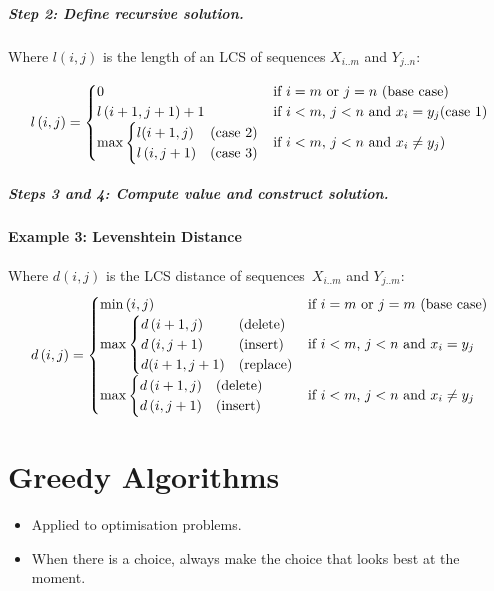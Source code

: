 \documentclass[twocolumn,english]{article}
\begin{document}
\subparagraph{Step 2: Define recursive solution.}

Where $l\left(i,j\right)$ is the length of an LCS of sequences $X_{i..m}$
and $Y_{j..n}$:

\[
l\left(i,j\right)=\begin{cases}
0 & \text{if \ensuremath{i=m} or \ensuremath{j=n} (base case)}\\
l\left(i+1,j+1\right)+1 & \text{if \ensuremath{i<m}, \ensuremath{j<n} and \ensuremath{x_{i}=y_{j}}(case 1)}\\
\max\begin{cases}
l(i+1,j) & \text{(case 2)}\\
l\left(i,j+1\right) & \text{(case 3)}
\end{cases} & \text{if \ensuremath{i<m}, \ensuremath{j<n} and \ensuremath{x_{i}\neq y_{j}})}
\end{cases}
\]

\subparagraph{Steps 3 and 4: Compute value and construct solution.}

\paragraph{Example 3: Levenshtein Distance}

Where $d\left(i,j\right)$ is the LCS distance of sequences~$X_{i..m}$
and $Y_{j..m}$:
\[
d\left(i,j\right)=\begin{cases}
\min\left(i,j\right) & \text{if \ensuremath{i=m} or \ensuremath{j=m} (base case)}\\
\max\begin{cases}
d\left(i+1,j\right) & \text{(delete)}\\
d\left(i,j+1\right) & \text{(insert)}\\
d(i+1,j+1) & \text{(replace)}
\end{cases} & \text{if \ensuremath{i<m}, \ensuremath{j<n} and \ensuremath{x_{i}=y_{j}}}\\
\max\begin{cases}
d\left(i+1,j\right) & \text{(delete)}\\
d\left(i,j+1\right) & \text{(insert)}
\end{cases} & \text{if \ensuremath{i<m}, \ensuremath{j<n} and \ensuremath{x_{i}\neq y_{j}}}
\end{cases}
\]

\section{Greedy Algorithms}
\begin{itemize}
\item Applied to optimisation problems.
\item When there is a choice, always make the choice that looks best at
the moment.
\end{itemize}
\end{document}
